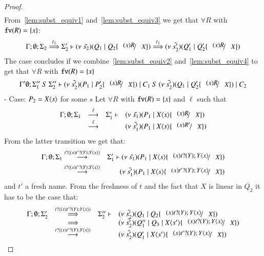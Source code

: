 \begin{proof}
\begin{eqnarray}
	\end{eqnarray}
%
	\noi From~\ref{lem:subst_equiv1} and~\ref{lem:subst_equiv3} we get that $\forall R$ with $\mathtt{fv}(R) = \{x\}$:
%
	\begin{eqnarray*}
		\Gamma; \es; \Sigma_2 \By{\ell_2} \Sigma_2' \proves \newsp{\tilde{s_2}}{Q_1 \Par Q_2 \subst{(x) R}{X}} \By{\ell_2} \newsp{\tilde{s_2'}}{Q_1' \Par Q_2' \subst{(x) R}{X}}
	\end{eqnarray*}
%
	\noi The case concludes if we combine~\ref{lem:subst_equiv2} and~\ref{lem:subst_equiv4} to get that $\forall R$ with $\mathtt{fv}(R) = \{x\}$
%
	\begin{eqnarray*}
		\Gamma' \es; \Sigma_1''\ S\ \Sigma_2'' \proves \newsp{\tilde{s_2'}}{P_1 \Par P_2' \subst{(x) R}{X}} \Par C_1\ S\ \newsp{\tilde{s_2'}}{Q_1 \Par Q_2' \subst{(x) R}{X}} \Par C_2
	\end{eqnarray*}
	\noi - Case: $P_2 = X\langle s \rangle$ for some $s$
%
	Let $\forall R$ with $\mathtt{fv}(R) = \{x\}$ and $\ell$ such that
\[
	\begin{array}{rcll}
		\Gamma; \es; \Sigma_1 &\by{\ell}& \Sigma_1' \proves & \newsp{\tilde{s_1}}{P_1 \Par \appl{X}{s} \subst{(x) R}{X}}\\
		&\by{\ell}& &
		\newsp{\tilde{s_1'}}{P_1 \Par \appl{X}{s} \subst{(x) R'}{X}}
	\end{array}
\]
%
	\noi From the latter transition we get that:
%
	\begin{eqnarray}
		\Gamma; \es; \Sigma_1 &\by{\bactinp{t}{(x) \binp{t'}{Y} \appl{Y}{x}}}& \Sigma_1' \proves \newsp{\tilde{s_1}}{P_1 \Par \appl{X}{s} \subst{(x) \binp{t}{Y} \appl{Y}{x}}{X}}\\
		&\by{\bactinp{t}{(x) \binp{t'}{Y} \appl{Y}{x}}}& 
		\newsp{\tilde{s_1'}}{P_1 \Par \appl{X}{s} \subst{(x) \binp{t'}{Y} \appl{Y}{x}}{X}}
		\label{lem:subst_equiv5}
	\end{eqnarray}
%
	\noi and $t'$ a fresh name. From the freshness of $t$ and the fact that $X$ is linear in $Q_2$
	it has to be the case that:
%
\[
	\begin{array}{rcll}
		\Gamma; \es; \Sigma_2' &\By{\bactinp{t}{(x) \binp{t'}{Y} \appl{Y}{x}}}& \Sigma_2'' \proves &
		\newsp{\tilde{s_2'}}{Q_1 \Par Q_2 \subst{(x) \binp{t}{Y} \appl{Y}{x}}{X}}\\
		&\By{}& &
		\newsp{\tilde{s_2'}}{Q_1'' \Par Q_3 \Par \appl{X}{s'} \subst{(x)\binp{t}{Y} \appl{Y}{x}}{X}} \\
		&\by{\bactinp{t}{(x) \binp{t'}{Y} \appl{Y}{x}}}& &
		\newsp{\tilde{s_2'}}{Q_1' \Par \appl{X}{s'} \subst{(x)\binp{t'}{Y} \appl{Y}{x}}{X}} \\

\end{array}\]
\end{proof}

